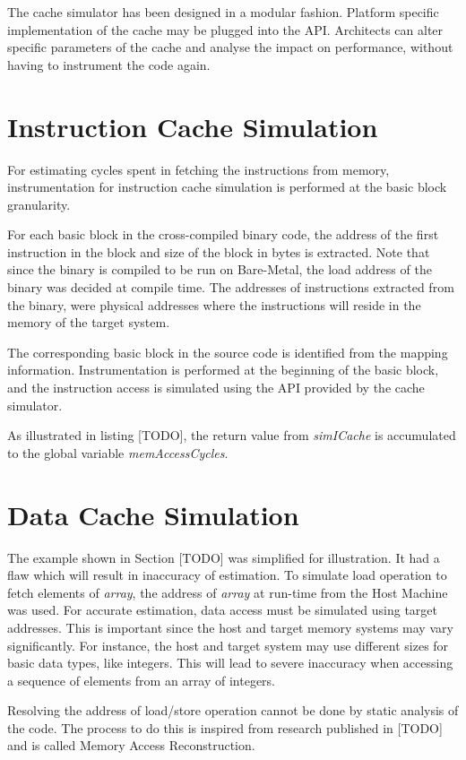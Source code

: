 The cache simulator has been designed in a modular fashion. Platform specific implementation of the cache may be plugged into the API. Architects can alter specific parameters of the cache and analyse the impact on performance, without having to instrument the code again.

\section{Instruction Cache Simulation}
For estimating cycles spent in fetching the instructions from memory, instrumentation for instruction cache simulation is performed at the basic block granularity. 

For each basic block in the cross-compiled binary code, the address of the first instruction in the block and size of the block in bytes is extracted. Note that since the binary is compiled to be run on Bare-Metal, the load address of the binary was decided at compile time. The addresses of instructions extracted from the binary, were physical addresses where the instructions will reside in the memory of the target system.

The corresponding basic block in the source code is identified from the mapping information. Instrumentation is performed at the beginning of the basic block, and the instruction access is simulated using the API provided by the cache simulator.

As illustrated in listing [TODO], the return value from \emph{simICache} is accumulated to the global variable \emph{memAccessCycles}.

\section{Data Cache Simulation}
The example shown in Section [TODO] was simplified for illustration. It had a flaw which will result in inaccuracy of estimation. To simulate load operation to fetch elements of \emph{array}, the address of \emph{array} at run-time from the Host Machine was used. For accurate estimation, data access must be simulated using target addresses. This is important since the host and target memory systems may vary significantly. For instance, the host and target system may use different sizes for basic data types, like integers. This will lead to severe inaccuracy when accessing a sequence of elements from an array of integers. 

Resolving the address of load/store operation cannot be done by static analysis of the code. The process to do this is inspired from research published in [TODO] and is called Memory Access Reconstruction. 

